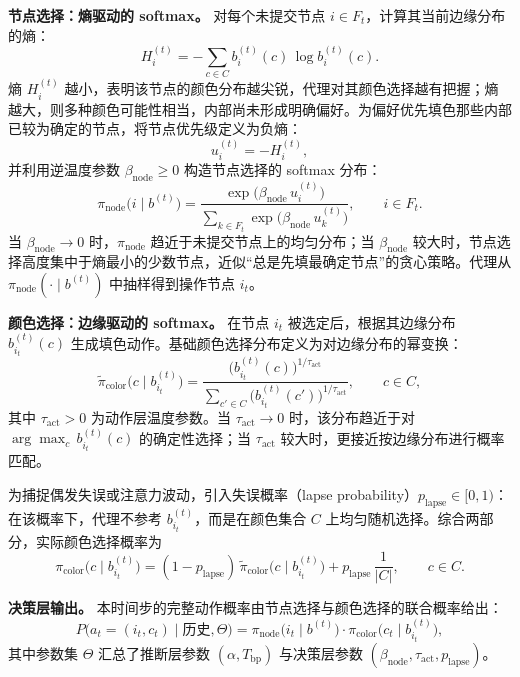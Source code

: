 \textbf{节点选择：熵驱动的 softmax。}
对每个未提交节点 $i\in F_t$，计算其当前边缘分布的熵：
\begin{equation}
  H_i^{(t)} = -\sum_{c\in C} b_i^{(t)}(c)\,\log b_i^{(t)}(c).
\end{equation}
熵 $H_i^{(t)}$ 越小，表明该节点的颜色分布越尖锐，代理对其颜色选择越有把握；熵越大，则多种颜色可能性相当，内部尚未形成明确偏好。为偏好优先填色那些内部已较为确定的节点，将节点优先级定义为负熵：
\begin{equation}
  u_i^{(t)} = -H_i^{(t)},
\end{equation}
并利用逆温度参数 $\beta_{\mathrm{node}}\ge 0$ 构造节点选择的 softmax 分布：
\begin{equation}
  \pi_{\mathrm{node}}\bigl(i\mid b^{(t)}\bigr)
  =
  \frac{\exp\!\bigl(\beta_{\mathrm{node}}\,u_i^{(t)}\bigr)}
       {\sum_{k\in F_t}\exp\!\bigl(\beta_{\mathrm{node}}\,u_k^{(t)}\bigr)},
  \qquad i\in F_t.
\end{equation}
当 $\beta_{\mathrm{node}}\to 0$ 时，$\pi_{\mathrm{node}}$ 趋近于未提交节点上的均匀分布；当 $\beta_{\mathrm{node}}$ 较大时，节点选择高度集中于熵最小的少数节点，近似“总是先填最确定节点”的贪心策略。代理从 $\pi_{\mathrm{node}}(\cdot\mid b^{(t)})$ 中抽样得到操作节点 $i_t$。

\textbf{颜色选择：边缘驱动的 softmax。}
在节点 $i_t$ 被选定后，根据其边缘分布 $b_{i_t}^{(t)}(c)$ 生成填色动作。基础颜色选择分布定义为对边缘分布的幂变换：
\begin{equation}
  \tilde{\pi}_{\mathrm{color}}\bigl(c\mid b_{i_t}^{(t)}\bigr)
  =
  \frac{\bigl(b_{i_t}^{(t)}(c)\bigr)^{1/\tau_{\mathrm{act}}}}
       {\sum_{c'\in C}\bigl(b_{i_t}^{(t)}(c')\bigr)^{1/\tau_{\mathrm{act}}}},
  \qquad c\in C,
\end{equation}
其中 $\tau_{\mathrm{act}}>0$ 为动作层温度参数。当 $\tau_{\mathrm{act}}\to 0$ 时，该分布趋近于对 $\arg\max_{c}\, b_{i_t}^{(t)}(c)$ 的确定性选择；当 $\tau_{\mathrm{act}}$ 较大时，更接近按边缘分布进行概率匹配。

为捕捉偶发失误或注意力波动，引入失误概率（lapse probability）$p_{\mathrm{lapse}}\in[0,1)$：在该概率下，代理不参考 $b_{i_t}^{(t)}$，而是在颜色集合 $C$ 上均匀随机选择。综合两部分，实际颜色选择概率为
\begin{equation}
  \pi_{\mathrm{color}}\bigl(c\mid b_{i_t}^{(t)}\bigr)
  =
  (1-p_{\mathrm{lapse}})\,\tilde{\pi}_{\mathrm{color}}\bigl(c\mid b_{i_t}^{(t)}\bigr)
  +
  p_{\mathrm{lapse}}\,\frac{1}{|C|},
  \qquad c\in C.
\end{equation}

\textbf{决策层输出。}
本时间步的完整动作概率由节点选择与颜色选择的联合概率给出：
\begin{equation}
  P\bigl(a_t=(i_t,c_t)\mid \text{历史},\Theta\bigr)
  =
  \pi_{\mathrm{node}}\bigl(i_t\mid b^{(t)}\bigr)\cdot
  \pi_{\mathrm{color}}\bigl(c_t\mid b_{i_t}^{(t)}\bigr),
\end{equation}
其中参数集 $\Theta$ 汇总了推断层参数 $(\alpha,T_{\mathrm{bp}})$ 与决策层参数 $(\beta_{\mathrm{node}},\tau_{\mathrm{act}},p_{\mathrm{lapse}})$。

